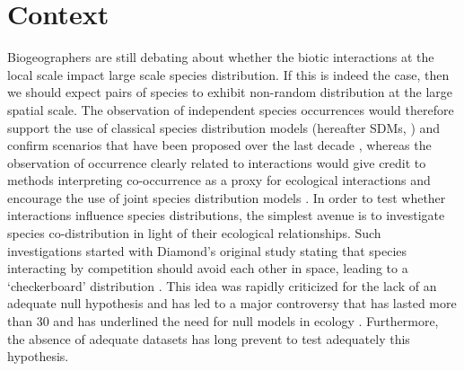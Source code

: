 \section{Context}\label{context}

Biogeographers are still debating about whether the biotic interactions
at the local scale impact large scale species distribution. If this is
indeed the case, then we should expect pairs of species to exhibit
non-random distribution at the large spatial scale. The observation of
independent species occurrences would therefore support the use of
classical species distribution models (hereafter SDMs,
\citet{Elith2006}) and confirm scenarios that have been proposed over
the last decade \citep{Thuiller2005, Thuiller2011, Albouy2012}, whereas
the observation of occurrence clearly related to interactions would give
credit to methods interpreting co-occurrence as a proxy for ecological
interactions \citep{Morales-Castilla2015} and encourage the use of joint
species distribution models \citep[hereafter
JSDM,][]{Ovaskainen2010, Pollock2014}. In order to test whether
interactions influence species distributions, the simplest avenue is to
investigate species co-distribution in light of their ecological
relationships. Such investigations started with Diamond's original study
stating that species interacting by competition should avoid each other
in space, leading to a `checkerboard' distribution \citep{Diamond1975}.
This idea was rapidly criticized for the lack of an adequate null
hypothesis \citep{Connor1979, Gilpin1982} and has led to a major
controversy that has lasted more than 30 \citep{Connor2013} and has
underlined the need for null models in ecology
\citep{Connor1983, Gotelli2000}. Furthermore, the absence of adequate
datasets has long prevent to test adequately this hypothesis.


